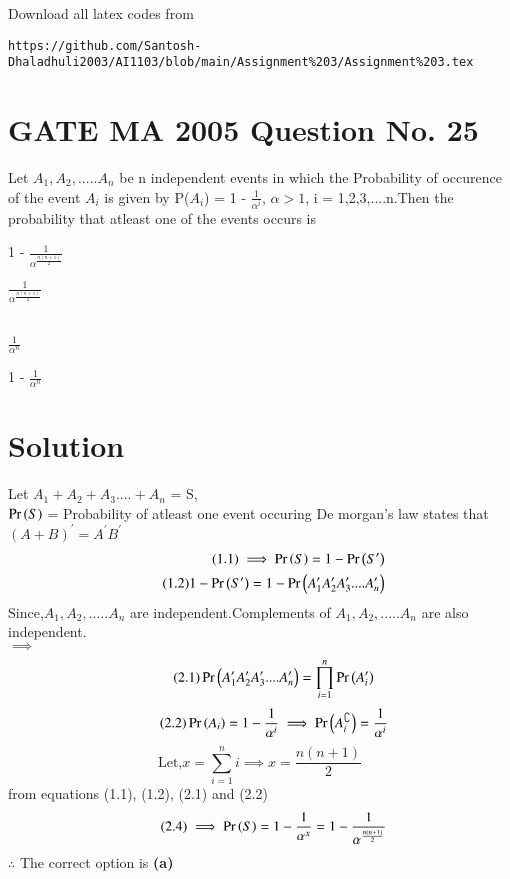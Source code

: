 \documentclass[journal,12pt,twocolumn]{IEEEtran}
\begin{document}
Download all latex codes from 
\begin{lstlisting}
https://github.com/Santosh-Dhaladhuli2003/AI1103/blob/main/Assignment%203/Assignment%203.tex
\end{lstlisting}
\section{\textbf{GATE MA 2005 Question No. 25}}
Let $A_{1},A_{2},.....A_{n}$ be n independent events in which the Probability of occurence of the event $A_{i}$ is given by P($A_{i}$) = 1 - $\frac{1}{\alpha^i}$, $\alpha >1$, i = 1,2,3,....n.Then the probability that atleast one of the events occurs is

\begin{inparaenum}[(a)]
    \item  1 - $\frac{1}{\alpha^\frac{n(n+1)}{2}}$ \hspace{0.95cm}
    \item  $\frac{1}{\alpha^\frac{n(n+1)}{2}}$\hspace{1.5cm}
    \\ \\
    \item  $\frac{1}{\alpha^n}$ \hspace{2.15cm}
    \item 1 - $\frac{1}{\alpha^n}$\hspace{0.95cm}
  \end{inparaenum}

\section{\textbf{Solution}}
Let $A_{1} + A_{2} + A_{3} .... + A_{n}$ = S, \\
$\Pr\left(S\right)$ = Probability of atleast one event occuring
De morgan's law states that $(A + B)^\prime = A^\prime B^\prime$  
\begin{align}
    \tag{1.1}
   \implies \Pr\left(S\right) = 1 - \Pr\left(S^\prime\right) \\ 
   \tag{1.2}
   1 - \Pr\left(S^\prime\right)= 1 - \Pr\left(A_{1}^\prime A_{2}^\prime A_{3}^\prime
   ....A_{n}^\prime\right)
\end{align}
Since,$A_{1},A_{2},.....A_{n}$ are independent.Complements of $A_{1},A_{2},.....A_{n}$ are also independent. \\
$\implies$ 
\begin{equation}
\tag{2.1}
\Pr\left(A_{1}^\prime A_{2}^\prime A_{3}^\prime
   ....A_{n}^\prime\right)=\prod_{i=1}^{n}\Pr\left(A_{i}^\prime\right)
\end{equation}
\begin{equation}
    \tag{2.2}
\Pr\left(A_{i}\right) = 1 - \frac{1}{\alpha^i} \implies \Pr\left(A_{i}^\complement\right) = \frac{1}{\alpha^i}
\end{equation}
\begin{equation}
    \tag{2.3}
\text{Let,} x = \sum_{i=1}^{n}i
\implies x = \frac{n(n+1)}{2}
\end{equation}
from equations (1.1), (1.2), (2.1) and (2.2)
\begin{equation}
\tag{2.4}
\implies \Pr\left(S\right) = 1 - \frac{1}{\alpha^x} = 1 - \frac{1}{\alpha^\frac{n(n+1)}{2}}
\end{equation}
$\therefore$ The correct option is \textbf{(a)}
\end{document}
